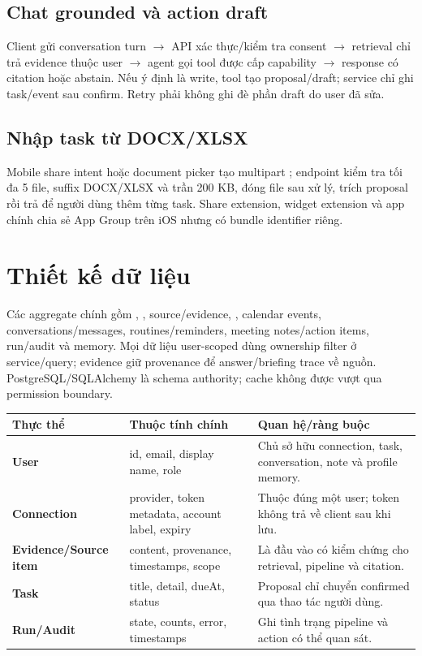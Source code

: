 \documentclass[11pt,a4paper]{article}
\begin{document}
\subsection{Chat grounded và action draft}
Client gửi conversation turn $\rightarrow$ API xác thực/kiểm tra consent $\rightarrow$ retrieval chỉ trả evidence thuộc user $\rightarrow$ agent gọi tool được cấp capability $\rightarrow$ response có citation hoặc abstain. Nếu ý định là write, tool tạo proposal/draft; service chỉ ghi task/event sau confirm. Retry phải không ghi đè phần draft do user đã sửa.

\subsection{Nhập task từ DOCX/XLSX}
Mobile share intent hoặc document picker tạo multipart ; endpoint  kiểm tra tối đa 5 file, suffix DOCX/XLSX và trần 200 KB, đóng file sau xử lý, trích proposal rồi trả để người dùng thêm từng task. Share extension, widget extension và app chính chia sẻ App Group trên iOS nhưng có bundle identifier riêng.

\section{Thiết kế dữ liệu}
Các aggregate chính gồm , , source/evidence, , calendar events, conversations/messages, routines/reminders, meeting notes/action items, run/audit và memory. Mọi dữ liệu user-scoped dùng ownership filter ở service/query; evidence giữ provenance để answer/briefing trace về nguồn. PostgreSQL/SQLAlchemy là schema authority; cache không được vượt qua permission boundary.

\begin{tabularx}{\textwidth}{>{\bfseries}p{3.2cm}p{4.3cm}X}
\toprule Thực thể & Thuộc tính chính & Quan hệ/ràng buộc \\ \midrule
User & id, email, display name, role & Chủ sở hữu connection, task, conversation, note và profile memory. \\
Connection & provider, token metadata, account label, expiry & Thuộc đúng một user; token không trả về client sau khi lưu. \\
Evidence/Source item & content, provenance, timestamps, scope & Là đầu vào có kiểm chứng cho retrieval, pipeline và citation. \\
Task & title, detail, dueAt, status & Proposal chỉ chuyển confirmed qua thao tác người dùng. \\
Run/Audit & state, counts, error, timestamps & Ghi tình trạng pipeline và action có thể quan sát. \\
\bottomrule
\end{tabularx}
\end{document}
